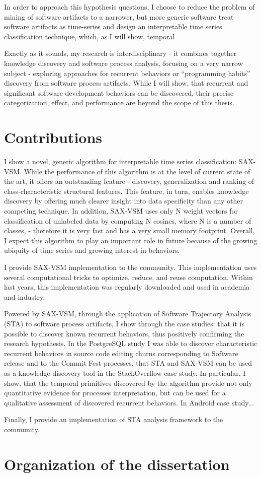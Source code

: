 In order to approach this hypothesis questions, I choose to reduce the problem of mining of software artifacts to a narrower,
but more generic software treat software artifacts as time-series and design an interpretable time 
series classification technique, which, 
as I will show, temporal 


Exactly as it sounds, my research is interdisciplinary - it combines together knowledge discovery and software process 
analysis, focusing on a very narrow subject - exploring approaches for recurrent behaviors or ``programming habits'' 
discovery from software process artifacts.
While I will show, that recurrent and significant software-development behaviors can be discovered,
their precise categorization, effect, and performance are beyond the scope of this thesis.

\section{Contributions}
I show a novel, generic algorithm for interpretable time series classification: SAX-VSM. 
While the performance of this algorithm is at the level of current state of the art, it offers an outstanding feature -
discovery, generalization and ranking of class-characteristic structural features. This feature, in turn, enables
knowledge discovery by offering much clearer insight into data specificity than any other competing technique.
In addition, SAX-VSM uses only N weight vectors for classification of unlabeled data by computing N cosines, where N is
a number of classes, - therefore it is very fast and has a very small memory footprint.
Overall, I expect this algorithm to play an important role in future because of the growing ubiquity of time series and
growing interest in behaviors.

I provide SAX-VSM implementation to the community. This implementation uses several computational tricks to optimize,
reduce, and reuse computation. Within last years, this implementation was regularly downloaded and used in academia and
industry. 

Powered by SAX-VSM, through the application of Software Trajectory Analysis (STA) to software process artifacts, I show
through the case studies: that it is possible to discover known recurrent behaviors, thus positively confirming the
research hypothesis. In the PostgreSQL study I was able to discover characteristic recurrent behaviors in source code
editing churns corresponding
to Software release and to the Commit Fest processes.
that STA and SAX-VSM can be used as a knowledge discovery tool in the StackOverflow case study. In particular, I show,
that the temporal primitives discovered by the algorithm provide not only quantitative evidence for processes
interpretation, but can be used for a qualitative assessment of discovered recurrent behaviors.
In Android case study...

Finally, I provide an implementation of STA analysis framework to the community. 

\section{Organization of the dissertation}